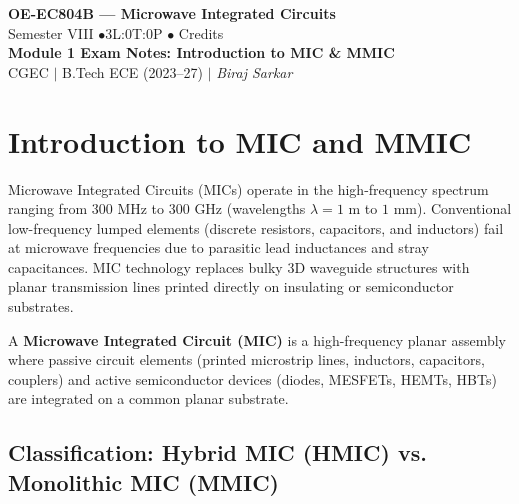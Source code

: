 \documentclass[10pt,a4paper]{article}
\begin{document}
\begin{center}
  {\LARGE\bfseries\color{myred} OE-EC804B --- Microwave Integrated Circuits}\\[5pt]
  {\normalsize\color{mydark} Semester VIII \quad$\bullet$\quad 3L:0T:0P \quad$\bullet$ Credits}\\[3pt]
  {\normalsize\color{myteal}\textbf{Module 1 Exam Notes: Introduction to MIC \& MMIC}}\\[3pt]
  {\small\color{mydark} CGEC \;$|$\; B.Tech ECE (2023--27) \;$|$\; \textit{Biraj Sarkar}}
\end{center}
\vspace{2pt}
\noindent{\color{myred}\rule{\linewidth}{1.5pt}}
\vspace{2pt}

\hypersetup{linkcolor=mydark}
\tableofcontents
\hypersetup{linkcolor=myteal}
\newpage

\section{Introduction to MIC and MMIC}

Microwave Integrated Circuits (MICs) operate in the high-frequency spectrum ranging from $300\text{ MHz}$ to $300\text{ GHz}$ (wavelengths $\lambda = 1\text{ m}$ to $1\text{ mm}$). Conventional low-frequency lumped elements (discrete resistors, capacitors, and inductors) fail at microwave frequencies due to parasitic lead inductances and stray capacitances. MIC technology replaces bulky 3D waveguide structures with planar transmission lines printed directly on insulating or semiconductor substrates.

\begin{tcolorbox}[defbox, title={Microwave Integrated Circuit (MIC)}]
  A \textbf{Microwave Integrated Circuit (MIC)} is a high-frequency planar assembly where passive circuit elements (printed microstrip lines, inductors, capacitors, couplers) and active semiconductor devices (diodes, MESFETs, HEMTs, HBTs) are integrated on a common planar substrate.
\end{tcolorbox}

\subsection{Classification: Hybrid MIC (HMIC) vs. Monolithic MIC (MMIC)}
\end{document}
